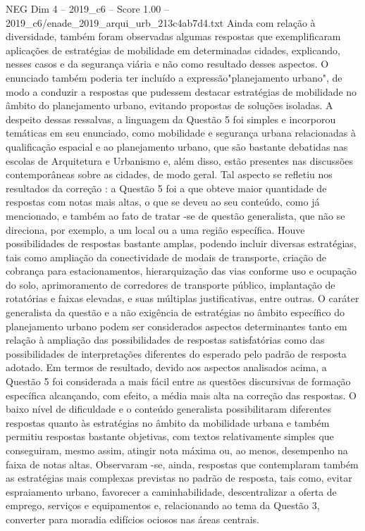 \begin{textsample}{NEG Dim 4 – 2019\_c6 – Score 1.00 – 2019\_c6/enade\_2019\_arqui\_urb\_213c4ab7d4.txt}
Ainda com relação à diversidade, também foram observadas algumas respostas que exemplificaram aplicações de estratégias de mobilidade em determinadas cidades, explicando, nesses casos e da segurança viária e não como resultado desses aspectos.
O enunciado também poderia ter incluído a expressão"planejamento urbano", de modo a conduzir a respostas que pudessem destacar estratégias de mobilidade no âmbito do planejamento urbano, evitando propostas de soluções isoladas.
A despeito dessas ressalvas, a linguagem da Questão 5 foi simples e incorporou temáticas em seu enunciado, como mobilidade e segurança urbana relacionadas à qualificação espacial e ao planejamento urbano, que são bastante debatidas nas escolas de Arquitetura e Urbanismo e, além disso, estão presentes nas discussões contemporâneas sobre as cidades, de modo geral.
Tal aspecto se refletiu nos resultados da correção : a Questão 5 foi a que obteve maior quantidade de respostas com notas mais altas, o que se deveu ao seu conteúdo, como já mencionado, e também ao fato de tratar -se de questão generalista, que não se direciona, por exemplo, a um local ou a uma região específica.
Houve possibilidades de respostas bastante amplas, podendo incluir diversas estratégias, tais como ampliação da conectividade de modais de transporte, criação de cobrança para estacionamentos, hierarquização das vias conforme uso e ocupação do solo, aprimoramento de corredores de transporte público, implantação de rotatórias e faixas elevadas, e suas múltiplas justificativas, entre outras.
O caráter generalista da questão e a não exigência de estratégias no âmbito específico do planejamento urbano podem ser considerados aspectos determinantes tanto em relação à ampliação das possibilidades de respostas satisfatórias como das possibilidades de interpretações diferentes do esperado pelo padrão de resposta adotado.
Em termos de resultado, devido aos aspectos analisados acima, a Questão 5 foi considerada a mais fácil entre as questões discursivas de formação específica alcançando, com efeito, a média mais alta na correção das respostas.
O baixo nível de dificuldade e o conteúdo generalista possibilitaram diferentes respostas quanto às estratégias no âmbito da mobilidade urbana e também permitiu respostas bastante objetivas, com textos relativamente simples que conseguiram, mesmo assim, atingir nota máxima ou, ao menos, desempenho na faixa de notas altas.
Observaram -se, ainda, respostas que contemplaram também as estratégias mais complexas previstas no padrão de resposta, tais como, evitar espraiamento urbano, favorecer a caminhabilidade, descentralizar a oferta de emprego, serviços e equipamentos e, relacionando ao tema da Questão 3, converter para moradia edifícios ociosos nas áreas centrais.

\end{textsample}
